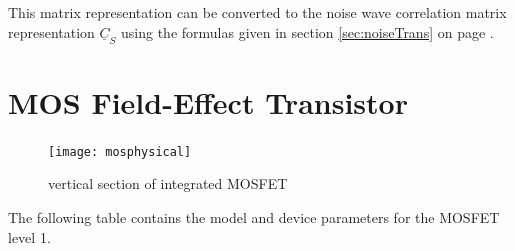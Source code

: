 \documentclass[10pt]{report}
\begin{document}
This matrix representation can be converted to the noise wave
correlation matrix representation $\underline{C}_S$ using the formulas
given in section \ref{sec:noiseTrans} on page
\pageref{sec:noiseTrans}.

\section{MOS Field-Effect Transistor}

\begin{figure}[ht]
\begin{center}
\texttt{[image: mosphysical]}
\end{center}
\caption{vertical section of integrated MOSFET}
\label{fig:MOSphysical}
\end{figure}
\FloatBarrier

The following table contains the model and device parameters for the
MOSFET level 1.

\addvspace{12pt}
\end{document}
